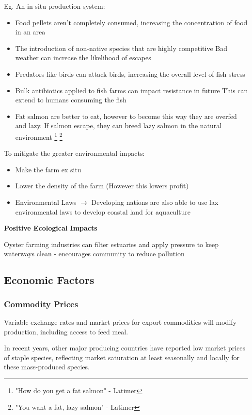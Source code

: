 			Eg. An in situ production system:
			\begin{itemize}
				\item Food pellets aren't completely consumed, increasing the concentration of food in an area
				\item The introduction of non-native species that are highly competitive
					\subitem Bad weather can increase the likelihood of escapes
				\item Predators like birds can attack birds, increasing the overall level of fish stress
				\item Bulk antibiotics applied to fish farms can impact resistance in future
					\subitem This can extend to humans consuming the fish 
				\item Fat salmon are better to eat, however to become this way they are overfed and lazy. If salmon escape, they can breed lazy salmon in the natural environment \footnote{"How do you get a fat salmon" - Latimer} \footnote{"You want a fat, lazy salmon" - Latimer}
			\end{itemize}

			To mitigate the greater environmental impacts:
			\begin{itemize}
				\item Make the farm ex situ
				\item Lower the density of the farm (However this lowers profit)
				\item Environmental Laws $\rightarrow$ Developing nations are also able to use lax environmental laws to develop coastal land for aquaculture
			\end{itemize}

			\textbf{Positive Ecological Impacts}

			Oyster farming industries can filter estuaries and apply pressure to keep waterways clean - encourages community to reduce pollution

		\subsection{Economic Factors}
			\subsubsection{Commodity Prices}
				Variable exchange rates and market prices for export commodities will modify production, including access to feed meal.

				In recent years, other major producing countries have reported low market prices of staple species, reflecting market saturation at least seasonally and locally for these mass-produced species.
				
